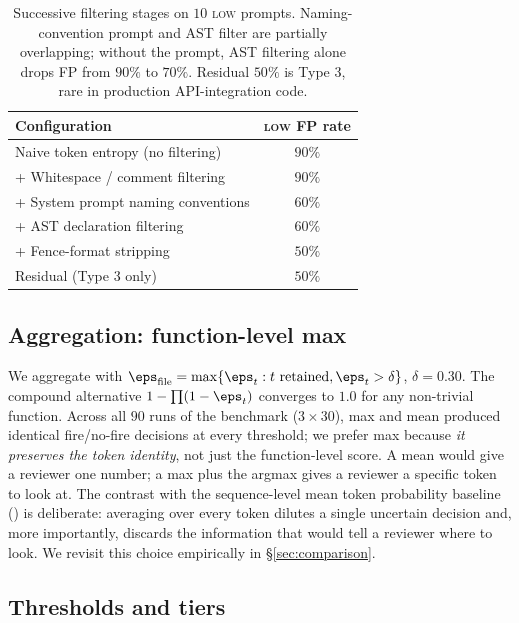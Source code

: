 \begin{table}[h]
\centering
\small
\begin{tabular}{lc}
\toprule
\textbf{Configuration} & \textbf{\textsc{low} FP rate} \\
\midrule
Naive token entropy (no filtering)                & $90\%$ \\
+ Whitespace / comment filtering                   & $90\%$ \\
+ System prompt naming conventions                 & $60\%$ \\
+ AST declaration filtering                        & $60\%$ \\
+ Fence-format stripping                           & $50\%$ \\
\midrule
Residual (Type 3 only)                             & $50\%$ \\
\bottomrule
\end{tabular}
\caption{Successive filtering stages on $10$ \textsc{low} prompts.
Naming-convention prompt and AST filter are partially overlapping;
without the prompt, AST filtering alone drops FP from $90\%$ to
$70\%$. Residual $50\%$ is Type 3, rare in production API-integration
code.}
\label{tab:filtering}
\end{table}

\subsection{Aggregation: function-level max}
\label{subsec:aggregation}

We aggregate with
$\eps_\text{file} = \max\{\eps_t : t \text{ retained}, \eps_t >
\delta\}$, $\delta = 0.30$. The compound alternative $1 - \prod(1 -
\eps_t)$ converges to $1.0$ for any non-trivial function. Across all
$90$ runs of the benchmark ($3 \times 30$), max and mean produced
identical fire/no-fire decisions at every threshold; we prefer max
because \emph{it preserves the token identity}, not just the
function-level score. A mean would give a reviewer one number; a
max plus the argmax gives a reviewer a specific token to look at.
The contrast with the sequence-level mean token probability baseline
(\papg) is deliberate: averaging over every token dilutes a single
uncertain decision and, more importantly, discards the information
that would tell a reviewer where to look. We revisit this choice
empirically in \S\ref{sec:comparison}.

\subsection{Thresholds and tiers}
\label{subsec:tiers}

